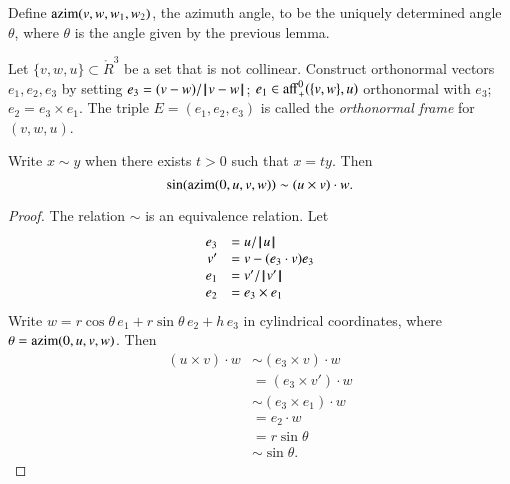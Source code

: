 \begin{definition}[azim] 
Define ${\operatorname{azim}}(v,w,w_1,w_2)$, the azimuth angle, 
to be the uniquely determined
angle $\theta$, where $\theta$ is the angle given by the previous
lemma.
%
%
%
\end{definition}

\begin{definition}[frame]
Let $\{v,w,u\}\subset\ring{R}^3$ be a set that is not collinear.
Construct orthonormal vectors  $e_1,e_2,e_3$ by setting
$e_3 = (v-w)/{\hskip0.1em|\hskip-0.15em|\hskip0.1em}v - w{\hskip0.1em|\hskip-0.15em|\hskip0.1em}$; 
$e_1\in{\operatorname{aff}}_+^0(\{v,w\},u)$ orthonormal with $e_3$;
$e_2 = e_3\times e_1$.
 The triple $E=(e_1,e_2,e_3)$ is called
the {\it orthonormal frame} for $(v,w,u)$.
\end{definition}
%

\begin{lemma}\label{lemma:sim}
Write $x\sim y$ when there exists $t>0$ such that $x= t y$. 
Then 
$$\sin({\operatorname{azim}}(0,u,v,w))\sim (u \times v)\cdot w.$$
\end{lemma}

\begin{proof}
The relation $\sim$ is an equivalence relation.
Let
$$
\begin{array}{rll}
   e_3 &= u/{{\hskip0.1em|\hskip-0.15em|\hskip0.1em}u{\hskip0.1em|\hskip-0.15em|\hskip0.1em}}\\
   v' &= v - (e_3\cdot v) e_3\\
   e_1 &= v'/{{\hskip0.1em|\hskip-0.15em|\hskip0.1em}v'{\hskip0.1em|\hskip-0.15em|\hskip0.1em}}\\
   e_2 &= e_3 \times e_1 \\
\end{array}
$$
Write $w= r\cos\theta\, e_1 + r\sin\theta \, e_2 + h\, e_3$ in cylindrical coordinates, where $\theta = {\operatorname{azim}}(0,u,v,w)$.
Then
$$
\begin{array}{rll}
   (u\times v)\cdot w &\sim (e_3\times v)\cdot w\\
   &= (e_3\times v')\cdot w\\
   &\sim (e_3\times e_1)\cdot w\\
   &= e_2 \cdot w\\
   &= r\sin\theta \\
   &\sim \sin\theta.
\end{array}
$$
\end{proof}

